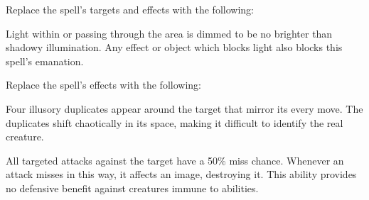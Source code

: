 Replace the spell's targets and effects with the following:
\begin{spellcontent}

\begin{augmenttargetinginfo}


\end{augmenttargetinginfo}


\begin{augmenteffects}



\spelleffect
Light within or passing through the area is dimmed to be no brighter than shadowy illumination.
Any effect or object which blocks light also blocks this spell's emanation.








\end{augmenteffects}

\end{spellcontent}








Replace the spell's effects with the following:
\begin{spellcontent}

\begin{augmenteffects}



\spelleffect
Four illusory duplicates appear around the target that mirror its every move.
The duplicates shift chaotically in its space, making it difficult to identify the real creature.

All targeted attacks against the target have a 50\% miss chance.
Whenever an attack misses in this way, it affects an image, destroying it.
This ability provides no defensive benefit against creatures immune to  abilities.








\end{augmenteffects}

\end{spellcontent}





